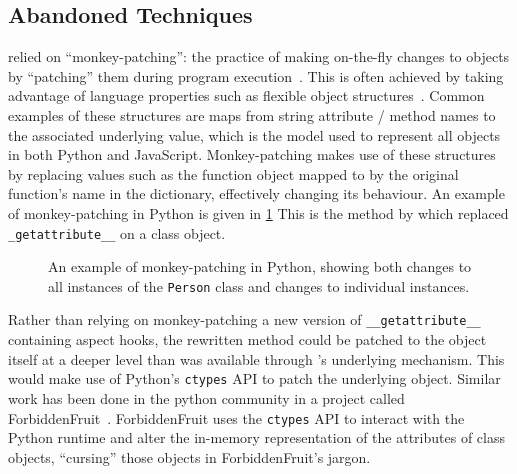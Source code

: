 \subsection{Abandoned Techniques}\label{subsec:pdsf3badweaving}

\pydysofu{} relied on ``monkey-patching'': the practice
of making on-the-fly changes to objects by ``patching''
them during program execution~\cite{advanced_python_monkey_patching}. This is
often achieved by taking advantage of language properties such as flexible
object structures~\cite{advanced_python_monkey_patching}. Common examples of
these structures are maps from string attribute / method names to the associated
underlying value, which is the model used to represent all objects in both
Python and JavaScript. Monkey-patching makes use of these structures by
replacing values such as the function object mapped to by the original
function's name in the dictionary, effectively changing its behaviour. An
example of monkey-patching in Python is given in \cref{fig:snippet-with-python-monkeypatching} This is
the method by which \pydysofu{} replaced \lstinline{_getattribute__} on a
class object.

\begin{figure}
    \centering
    
    \caption{An example of monkey-patching in Python, showing both changes to
    all instances of the \texttt{Person} class and changes to individual
    instances.}
    \label{fig:snippet-with-python-monkeypatching}
\end{figure}

Rather than relying on monkey-patching a new version of
\lstinline{__getattribute__} containing aspect hooks, the rewritten method could
be patched to the object itself at a deeper level than was available through
\pydysofu{}'s underlying mechanism. This would make use of Python's
\lstinline{ctypes} API to patch the underlying object. Similar work has been
done in the python community in a project called
ForbiddenFruit~\cite{forbiddenfruit_repo}. ForbiddenFruit uses the
\lstinline{ctypes} API to interact with the Python runtime and alter the
in-memory representation of the attributes of class objects, ``cursing'' those
objects in ForbiddenFruit's jargon.

